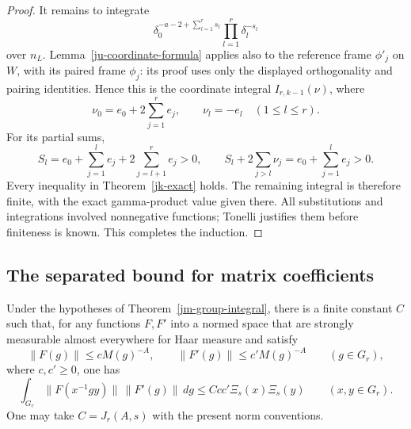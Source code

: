 \begin{proof}
It remains to integrate
\[
 \delta_0^{-a-2+\sum_{l=1}^{r}s_l}
                                  \prod_{l=1}^{r}\delta_l^{-s_l}
\]
over \(n_L\).
Lemma~\ref{ju-coordinate-formula} applies also to the
reference frame \(\phi'_j\) on \(W\), with its paired frame
\(\phi_j\): its proof uses only the displayed orthogonality
and pairing identities.  Hence this is the coordinate integral
\(I_{r,k-1}(\nu)\), where
\[
           \nu_0=e_0+2\sum_{j=1}^{r}e_j,\qquad
           \nu_l=-e_l\quad(1\leq l\leq r).
\]
For its partial sums,
\[
 S_l=e_0+\sum_{j=1}^{l}e_j+2\sum_{j=l+1}^{r}e_j>0,\qquad
 S_l+2\sum_{j>l}\nu_j=e_0+\sum_{j=1}^{l}e_j>0.
\]
Every inequality in Theorem~\ref{jk-exact} holds.
The remaining integral is therefore finite, with the exact
gamma-product value given there.
All substitutions and integrations involved nonnegative
functions; Tonelli justifies them before finiteness is known.
This completes the induction.
\end{proof}

\subsection{The separated bound for matrix coefficients}

\begin{proposition}\label{jm-coefficient}
Under the hypotheses of Theorem~\ref{jm-group-integral},
there is a finite constant \(C\) such that, for any functions
\(F,F'\) into a normed space that are strongly measurable
almost everywhere for Haar measure and satisfy
\[
 \|F(g)\|\leq cM(g)^{-A},\qquad
 \|F'(g)\|\leq c'M(g)^{-A}\qquad(g\in G_r),
\]
where \(c,c'\geq0\), one has
\begin{equation}\label{jm-coefficient-bound}
 \int_{G_r}\|F(x^{-1}gy)\|\,\|F'(g)\|\,dg
                         \leq Ccc'\Xi_s(x)\Xi_s(y)
                                  \qquad(x,y\in G_r).
\end{equation}
One may take \(C=J_r(A,s)\) with the present norm conventions.
\end{proposition}

